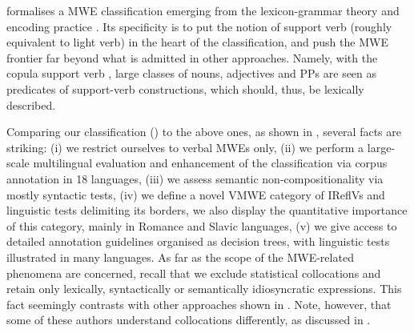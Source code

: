 \documentclass[output=paper,
modfonts,
]{langscibook}
\begin{document}
\citet{Laporte:forth} formalises a MWE classification emerging from the lexicon-grammar theory and encoding practice \citep{Gross:1986:LRC:991365.991367,gross:hal-00621380}. Its specificity is to put the notion of support verb (roughly equivalent to light verb) in the heart of the classification, and push the MWE frontier far beyond what is admitted in other approaches. Namely, with the copula support verb , large classes of nouns, adjectives and PPs are seen as predicates of support-verb constructions, which should, thus, be lexically described.

Comparing our classification () to the above ones, as shown in , several facts are striking: (i) we restrict ourselves to verbal MWEs only, (ii) we perform a large-scale multilingual evaluation and enhancement of the classification via corpus annotation in 18 languages, (iii) we assess semantic non-compositionality via mostly syntactic tests, (iv) we define a novel VMWE category of IReflVs and linguistic tests delimiting its borders, we also display the quantitative importance of this category, mainly in Romance and Slavic languages, (v) we give access to detailed annotation guidelines organised as decision trees, with linguistic tests illustrated in many languages. As far as the scope of the MWE-related phenomena are concerned, recall that we exclude statistical collocations and retain only lexically, syntactically or semantically idiosyncratic expressions. This fact seemingly contrasts with other approaches shown in . Note, however, that some of these authors understand collocations differently, as discussed in . 

\end{document}
